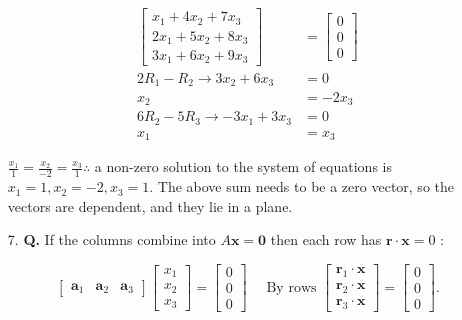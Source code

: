 \documentclass[main.tex]{subfiles}
\begin{document}
\begin{enumerate}
        $$
        \begin{aligned}
        \left[\begin{array}{l}
        x_{1}+4 x_{2}+7 x_{3} \\
        2 x_{1}+5 x_{2}+8 x_{3} \\
        3 x_{1}+6 x_{2}+9 x_{3}
        \end{array}\right] & =\left[\begin{array}{l}
        0 \\
        0 \\
        0
        \end{array}\right] \\
        2R_1 - R_2 \rightarrow 3x_2 + 6x_3 & = 0 \\
        x_2 & = -2x_3 \\
        6R_2 - 5R_3 \rightarrow -3x_1 + 3x_3 & = 0 \\
        x_1 & = x_3
        \end{aligned}
        $$
        
        $\frac{x_{1}}{1}=\frac{x_{2}}{-2}=\frac{x_{3}}{1} \therefore$ a non-zero solution to the system of equations is $x_{1}=1, x_{2}=-2, x_{3}=1$. The above sum needs to be a zero vector, so the vectors are dependent, and they lie in a plane.
        
        \item [7.] \textbf{Q.} If the columns combine into $A \bm{x}=\bm{0}$ then each row has $\bm{r} \cdot \bm{x}=0$ :
        
        $$
        \left[\begin{array}{lll}
        \bm{a}_{1} & \bm{a}_{2} & \bm{a}_{3}
        \end{array}\right]\left[\begin{array}{l}
        x_{1} \\
        x_{2} \\
        x_{3}
        \end{array}\right]=\left[\begin{array}{l}
        0 \\
        0 \\
        0
        \end{array}\right] \quad \text { By rows }\left[\begin{array}{l}
        \boldsymbol{r}_{1} \cdot \boldsymbol{x} \\
        \boldsymbol{r}_{2} \cdot \boldsymbol{x} \\
        \boldsymbol{r}_{3} \cdot \boldsymbol{x}
        \end{array}\right]=\left[\begin{array}{l}
        0 \\
        0 \\
        0
        \end{array}\right] .
        $$
        

\end{enumerate}
\end{document}
